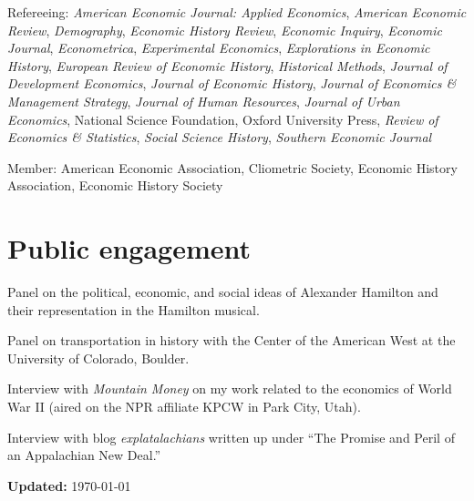\documentclass[11pt,letterpaper]{article}
\begin{document}
\begin{description}[leftmargin=0in,itemsep=.25em,itemindent=0in]
\item Refereeing: \emph{American Economic Journal: Applied Economics}, \emph{American Economic Review}, \emph{Demography}, \emph{Economic History Review}, \emph{Economic Inquiry}, \emph{Economic Journal}, \emph{Econometrica}, \emph{Experimental Economics}, \emph{Explorations in Economic History}, \emph{European Review of Economic History}, \emph{Historical Methods}, \emph{Journal of Development Economics}, \emph{Journal of Economic History}, \emph{Journal of Economics \& Management Strategy}, \emph{Journal of Human Resources}, \emph{Journal of Urban Economics}, National Science Foundation, Oxford University Press, \emph{Review of Economics \& Statistics}, \emph{Social Science History}, \emph{Southern Economic Journal} 

\item Member: American Economic Association, Cliometric Society, Economic History Association, Economic History Society
\end{description}

\vspace{-1em}
\section*{Public engagement}

\begin{description}[leftmargin=.75in,itemsep=.25em,itemindent=0in]

\item[Mar 2021] Panel on the political, economic, and social ideas of Alexander Hamilton and their representation in the Hamilton musical.

\item[Oct 2019] Panel on transportation in history with the Center of the American West at the University of Colorado, Boulder.

\item[Apr 2019] Interview with \emph{Mountain Money} on my work related to the economics of World War II (aired on the NPR affiliate KPCW in Park City, Utah).

\item[Dec 2018] Interview with blog \emph{explatalachians} written up under ``The Promise and Peril of an Appalachian New Deal.''
\end{description}

\vspace{.5in}

\textbf{Updated:} \today
\end{document}
